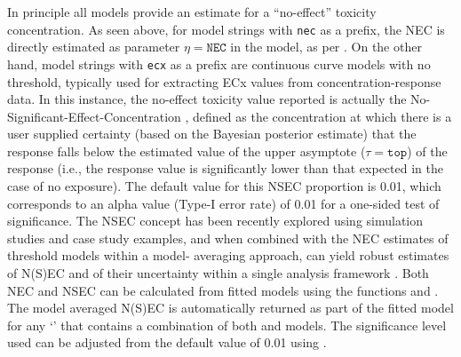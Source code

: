 \documentclass[
  shortnames]{jss}
\newcommand{\cls}[1]{`\code{#1}'}
\begin{document}
In principle all models provide an estimate for a ``no-effect'' toxicity concentration. As seen above, for model strings with \texttt{nec} as a prefix, the NEC is directly estimated as parameter \(\eta = \mathtt{NEC}\) in the model, as per \citet{Fox2010}. On the other hand, model strings with \texttt{ecx} as a prefix are continuous curve models with no threshold, typically used for extracting ECx values from concentration-response data. In this instance, the no-effect toxicity value reported is actually the No-Significant-Effect-Concentration \citep[NSEC, see details in][]{Fisher2023}, defined as the concentration at which there is a user supplied certainty (based on the Bayesian posterior estimate) that the response falls below the estimated value of the upper asymptote (\(\tau = \mathtt{top}\)) of the response (i.e., the response value is significantly lower than that expected in the case of no exposure). The default value for this NSEC proportion is 0.01, which corresponds to an alpha value (Type-I error rate) of 0.01 for a one-sided test of significance. The NSEC concept has been recently explored using simulation studies and case study examples, and when combined with the NEC estimates of threshold models within a model‐
averaging approach, can yield robust estimates of N(S)EC and of their uncertainty within a single
analysis framework \citep{fisher2023ieam}. Both NEC and NSEC can be calculated from fitted models using the functions  and . The model averaged N(S)EC is automatically returned as part of the fitted model for any \cls{bayesmanecfit} that contains a combination of both  and  models. The significance level used can be adjusted from the default value of 0.01 using .
\end{document}
